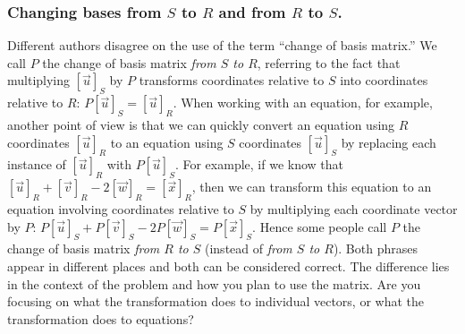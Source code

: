 \subsubsection{Changing bases from $S$ to $R$ and from $R$ to $S$.}
Different authors disagree on the use of the term ``change of basis matrix.'' 
We call $P$ the change of basis matrix \emph{from $S$ to $R$}, referring to the fact that multiplying $[\vec u]_S$ by $P$ transforms coordinates relative to $S$ into coordinates relative to $R$: $P[\vec u]_S=[\vec u]_R$.  
When working with an equation, for example, another point of view is that we can quickly convert an equation using $R$ coordinates $[\vec u]_{R}$ to an equation using $S$ coordinates $[\vec u]_S$ by replacing each instance of $[\vec u]_{R}$ with $P[\vec u]_S$.  For example, if we know that $[\vec u]_R+[\vec v]_R-2[\vec w]_R=[\vec x]_R$, then we can transform this equation to an equation involving coordinates relative to $S$ by multiplying each coordinate vector by $P$: $P[\vec u]_S+P[\vec v]_S-2P[\vec w]_S=P[\vec x]_S$.  Hence some people call $P$ the change of basis matrix \emph{from $R$ to $S$} (instead of \emph{from $S$ to $R$}).
Both phrases appear in different places and both can be considered correct. The difference lies in the context of the problem and how you plan to use the matrix. Are you focusing on what the transformation does to individual vectors, or what the transformation does to equations? 

	
